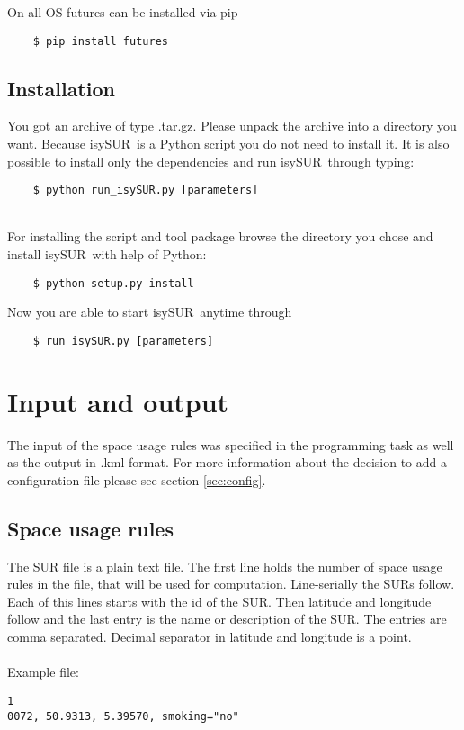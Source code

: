 \documentclass[11pt,fleqn]{book} %
\newcommand{\ProjectTitle}{isySUR}
\newcommand{\pt}{\ProjectTitle}
\begin{document}
\begin{enumerate}
On all OS futures can be installed via pip
\begin{verbatim}
	$ pip install futures
\end{verbatim}
\end{enumerate}

\subsection{Installation}
You got an archive of type .tar.gz. Please unpack the archive into a directory you want. Because \pt\ is a Python script you do not need to install it. It is also possible to install only the dependencies and run \pt\ through typing:
\begin{verbatim}
	$ python run_isySUR.py [parameters]
\end{verbatim}
~\\

For installing the script and tool package browse the directory you chose and install \pt\ with help of Python:
\begin{verbatim}
	$ python setup.py install
\end{verbatim}
Now you are able to start \pt\ anytime through
\begin{verbatim}
	$ run_isySUR.py [parameters]
\end{verbatim}

\section{Input and output}\label{sec:io}
The input of the space usage rules was specified in the programming task as well as the output in .kml format. For more information about the decision to add a configuration file please see section \ref{sec:config}.

\subsection{Space usage rules}
The SUR file is a plain text file. The first line holds the number of space usage rules in the file, that will be used for computation. Line-serially the SURs follow. Each of this lines starts with the id of the SUR. Then latitude and longitude follow and the last entry is the name or description of the SUR. The entries are comma separated. Decimal separator in latitude and longitude is a point.
\\~\\
Example file:
\begin{verbatim}
1
0072, 50.9313, 5.39570, smoking="no"
\end{verbatim}
\end{document}

